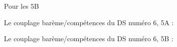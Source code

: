 \begin{center}
   
\end{center}

\vfill

Pour les 5B

\begin{center}
   
\end{center}


Le couplage barème/compétences du DS numéro 6, 5A :

\begin{center}
   
\end{center}

Le couplage barème/compétences du DS numéro 6, 5B :

\begin{center}
   
\end{center}
